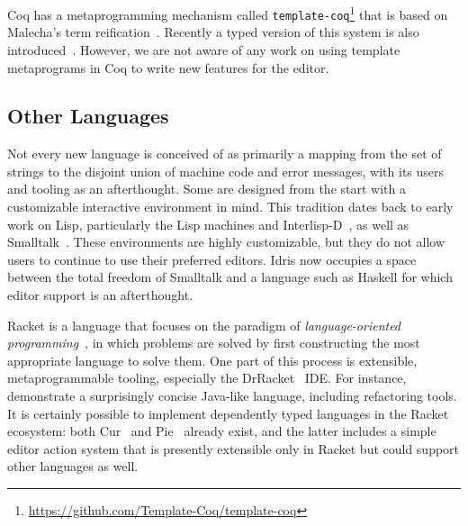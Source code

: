 Coq has a metaprogramming mechanism called
\texttt{template-coq}\footnote{\url{https://github.com/Template-Coq/template-coq}} that is based on
Malecha's term reification~\cite{malecha-phd}. Recently a typed
version of this system is also introduced~\cite{typed-template-coq}.
However, we are not aware of any work on using template metaprograms in Coq to
write new features for the editor.



\subsection{Other Languages}

Not every new language is conceived of as primarily a mapping from the
set of strings to the disjoint union of machine code and error
messages, with its users and tooling as an afterthought. Some are
designed from the start with a customizable interactive environment in
mind. This tradition dates back to early work on Lisp, particularly
the Lisp machines and Interlisp-D~\citep{LispHist}, as well as
Smalltalk~\citep{Goldberg1984SmalltalkEnv}. These environments are
highly customizable, but they do not allow users to continue to use
their preferred editors. Idris now occupies a space between the total
freedom of Smalltalk and a language such as Haskell for which editor
support is an afterthought.

Racket is a language that focuses on the paradigm of
\emph{language-oriented programming}~\citep{racketManifesto}, in which
problems are solved by first constructing the most appropriate
language to solve them. One part of this process is extensible,
metaprogrammable tooling, especially the DrRacket~\cite{revenge}
IDE. For instance, \citet{feltey2016languages} demonstrate a
surprisingly concise Java-like language, including refactoring tools.
It is certainly possible to implement dependently typed languages in
the Racket ecosystem: both Cur~\cite{cur} and
Pie~\cite{theLittleTyper} already exist, and the latter includes a
simple editor action system that is presently extensible only in
Racket but could support other languages as well.

